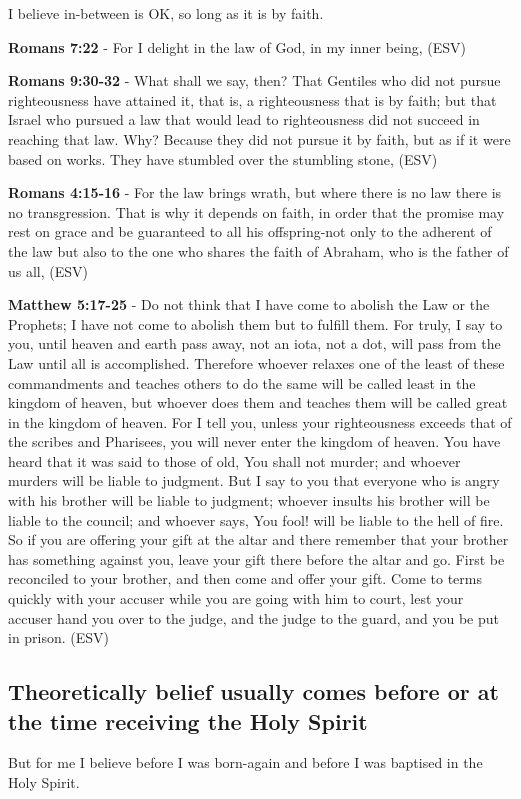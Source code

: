 \documentclass[11pt]{article}
\begin{document}
I believe in-between is OK, so long as it is by faith.

\textbf{Romans 7:22} - For I delight in the law of God, in my inner being, (ESV)

\textbf{Romans 9:30-32} - What shall we say, then? That Gentiles who did not pursue righteousness have attained it, that is, a righteousness that is by faith; but that Israel who pursued a law that would lead to righteousness did not succeed in reaching that law. Why? Because they did not pursue it by faith, but as if it were based on works. They have stumbled over the stumbling stone, (ESV)

\textbf{Romans 4:15-16} - For the law brings wrath, but where there is no law there is no transgression. That is why it depends on faith, in order that the promise may rest on grace and be guaranteed to all his offspring-not only to the adherent of the law but also to the one who shares the faith of Abraham, who is the father of us all, (ESV)

\textbf{Matthew 5:17-25} - Do not think that I have come to abolish the Law or the Prophets; I have not come to abolish them but to fulfill them. For truly, I say to you, until heaven and earth pass away, not an iota, not a dot, will pass from the Law until all is accomplished. Therefore whoever relaxes one of the least of these commandments and teaches others to do the same will be called least in the kingdom of heaven, but whoever does them and teaches them will be called great in the kingdom of heaven. For I tell you, unless your righteousness exceeds that of the scribes and Pharisees, you will never enter the kingdom of heaven. You have heard that it was said to those of old, You shall not murder; and whoever murders will be liable to judgment. But I say to you that everyone who is angry with his brother will be liable to judgment; whoever insults his brother will be liable to the council; and whoever says, You fool! will be liable to the hell of fire. So if you are offering your gift at the altar and there remember that your brother has something against you, leave your gift there before the altar and go. First be reconciled to your brother, and then come and offer your gift. Come to terms quickly with your accuser while you are going with him to court, lest your accuser hand you over to the judge, and the judge to the guard, and you be put in prison. (ESV)

\subsection{Theoretically belief usually comes before or at the time receiving the Holy Spirit}
\label{sec:org76b4f42}
But for me I believe before I was born-again and before I was baptised in the Holy Spirit.
\end{document}
